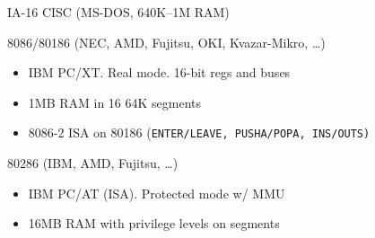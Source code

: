 \documentclass[mathserif,xcolor={dvipsnames,table}]{beamer}
\begin{document}
\begin{frame}[t]{IA-16 CISC (MS-DOS, 640K--1M RAM)}
\begin{block}{8086/80186 (NEC, AMD, Fujitsu, OKI, Kvazar-Mikro, \ldots)}
\begin{itemize}
\item IBM PC/XT. Real mode. 16-bit regs and buses
\item 1MB RAM in 16 64K segments
\item 8086-2 ISA on 80186
{\footnotesize
(\tt{ENTER}/\tt{LEAVE}, \tt{PUSHA}/\tt{POPA}, \tt{INS}/\tt{OUTS})
}
\end{itemize}
\end{block}
\begin{block}{80286 (IBM, AMD, Fujitsu, \ldots)}
\begin{itemize}
\item IBM PC/AT (ISA). Protected mode w/ MMU
\item 16MB RAM with privilege levels on segments
\end{itemize}
\end{block}
\vfill
\begin{center}
\end{center}
\end{frame}
\end{document}
